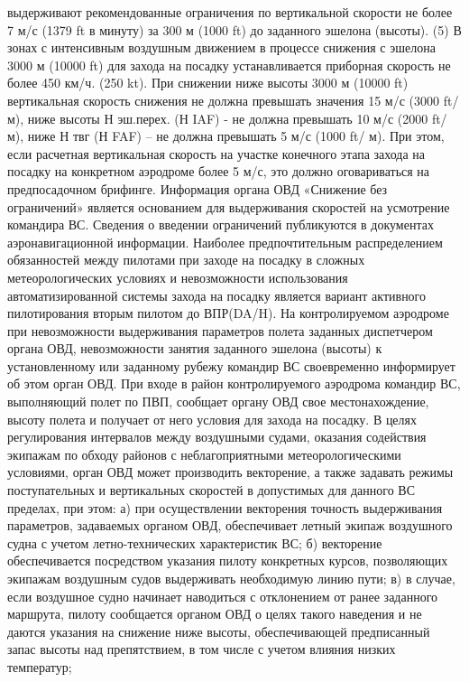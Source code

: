 выдерживают рекомендованные ограничения по вертикальной скорости не более 7 м/с (1379 ft в минуту) за 300 м (1000 ft) до заданного эшелона (высоты).
(5) В зонах с интенсивным воздушным движением в процессе снижения с эшелона 3000 м (10000 ft) для захода на посадку устанавливается приборная скорость не более 450 км/ч. (250 kt).
При снижении ниже высоты 3000 м (10000 ft) вертикальная скорость снижения не должна превышать значения 15 м/с (3000 ft/м), ниже высоты Н эш.перех. (Н IAF) - не должна превышать 10 м/с (2000 ft/ м), ниже Н твг (Н FAF) – не должна превышать 5 м/с (1000 ft/ м). При этом, если расчетная вертикальная скорость на участке конечного этапа захода на посадку на конкретном аэродроме более 5 м/с, это должно оговариваться на предпосадочном брифинге.
Информация органа ОВД «Снижение без ограничений» является основанием для выдерживания скоростей на усмотрение командира ВС.
Сведения о введении ограничений публикуются в документах аэронавигационной информации. 
Наиболее предпочтительным распределением обязанностей между пилотами при заходе на посадку в сложных метеорологических условиях и невозможности использования автоматизированной системы захода на посадку является вариант активного пилотирования вторым пилотом до ВПР(DA/H). 
На контролируемом аэродроме при невозможности выдерживания параметров полета заданных диспетчером органа ОВД, невозможности занятия заданного эшелона (высоты) к установленному или заданному рубежу командир ВС своевременно информирует об этом орган ОВД.
При входе в район контролируемого аэродрома командир ВС, выполняющий полет по ПВП, сообщает органу ОВД свое местонахождение, высоту полета и получает от него условия для захода на посадку.
В целях регулирования интервалов между воздушными судами, оказания содействия экипажам по обходу районов с неблагоприятными метеорологическими условиями, орган ОВД может производить векторение, а также задавать режимы поступательных и вертикальных скоростей в допустимых для данного ВС пределах, при этом:
а)	при осуществлении векторения точность выдерживания параметров, задаваемых органом ОВД, обеспечивает летный экипаж воздушного судна с учетом летно-технических характеристик ВС;
б)	векторение обеспечивается посредством указания пилоту конкретных курсов, позволяющих экипажам воздушным судов выдерживать необходимую линию пути; 
в)	в случае, если воздушное судно начинает наводиться с отклонением от ранее заданного маршрута, пилоту сообщается органом ОВД о целях такого наведения и не даются указания на снижение ниже высоты, обеспечивающей предписанный запас высоты над препятствием, в том числе с учетом влияния низких температур;
